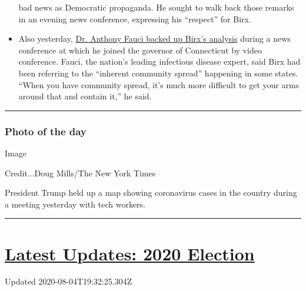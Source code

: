 \begin{itemize}
  bad news as Democratic propaganda. He sought to walk back those
  remarks in an evening news conference, expressing his ``respect'' for
  Birx.
\item
  Also yesterday,
  \href{https://www.nytimes.com/2020/08/03/world/coronavirus-covid-19.html\#link-4e40df05}{Dr.
  Anthony Fauci backed up Birx's analysis} during a news conference at
  which he joined the governor of Connecticut by video conference.
  Fauci, the nation's leading infectious disease expert, said Birx had
  been referring to the ``inherent community spread'' happening in some
  states. ``When you have community spread, it's much more difficult to
  get your arms around that and contain it,'' he said.
\end{itemize}

\begin{center}\rule{0.5\linewidth}{\linethickness}\end{center}

\hypertarget{photo-of-the-day}{%
\subsubsection{Photo of the day}\label{photo-of-the-day}}

Image

Credit...Doug Mills/The New York Times

President Trump held up a map showing coronavirus cases in the country
during a meeting yesterday with tech workers.

\begin{center}\rule{0.5\linewidth}{\linethickness}\end{center}

\hypertarget{latest-updates-2020-election}{%
\section{\texorpdfstring{\href{https://www.nytimes.com/2020/08/04/us/elections/primary-election-michigan-arizona-kansas.html?action=click\&pgtype=Article\&state=default\&region=MAIN_CONTENT_1\&context=storylines_live_updates}{Latest
Updates: 2020
Election}}{Latest Updates: 2020 Election}}\label{latest-updates-2020-election}}

Updated 2020-08-04T19:32:25.304Z

